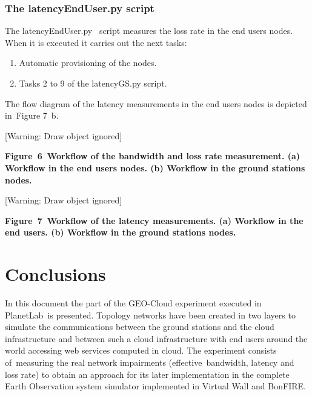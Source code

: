 \documentclass[a4paper]{article}
\newcounter{saveenum}
\newcommand\liststyleLFOxiii{%
\renewcommand\theenumi{\arabic{enumi}}
\renewcommand\theenumii{\roman{enumii}}
\renewcommand\theenumiii{\arabic{enumiii}}
\renewcommand\labelenumi{\theenumi.}
\renewcommand\labelitemi{o}
\renewcommand\labelenumii{\theenumii.}
\renewcommand\labelenumiii{\theenumiii.}
}
\begin{document}
\subsubsection{The latencyEndUser.py script}

\bigskip

The latencyEndUser.py \ script measures the loss rate in the end users
nodes. When it is executed it carries out the next tasks:

\liststyleLFOxiii
\setcounter{saveenum}{\value{enumi}}
\begin{enumerate}
\setcounter{enumi}{\value{saveenum}}
\item Automatic provisioning of the nodes.
\item Tasks 2 to 9 of the latencyGS.py script.
\end{enumerate}

\bigskip

The flow diagram of the latency measurements in the end users nodes is
depicted in\ Figure 7\ b.

[Warning: Draw object ignored]

{\bfseries
\label{bkm:Ref387330064}Figure\ 6\ Workflow of the bandwidth and loss
rate measurement. (a) Workflow in the end users nodes. (b) Workflow in
the ground stations nodes.}


\bigskip

[Warning: Draw object ignored]

{\bfseries
\label{bkm:Ref387331646}Figure\ 7\ Workflow of the latency measurements.
(a) Workflow in the end users. (b) Workflow in the ground stations
nodes.\ }


\bigskip


\bigskip

\section[Conclusions]{Conclusions}
\hypertarget{Toc387315389}{}In this document the part of the GEO-Cloud
experiment executed in PlanetLab\ is presented. Topology networks have
been created in two layers to simulate the communications between the
ground stations and the cloud infrastructure and between such a cloud
infrastructure with end users around the world accessing web services
computed in cloud. The experiment consists of\ measuring the real
network impairments (effective\ bandwidth, latency and loss rate) to
obtain an approach for its later implementation in the complete Earth
Observation system simulator implemented in Virtual Wall and BonFIRE.\ 
\end{document}
